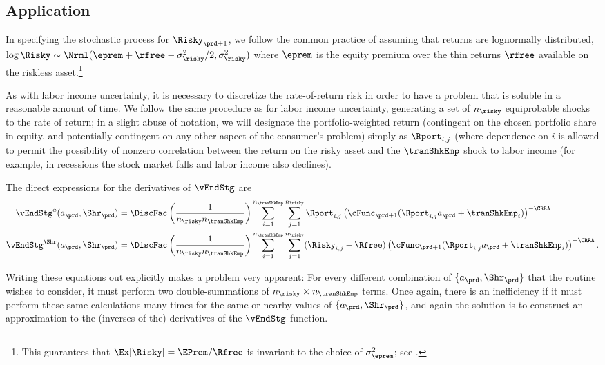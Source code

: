 \documentclass[SolvingMicroDSOPs]{subfiles}
\begin{document}
\subsection{Application}\label{subsec:MCApplication}


In specifying the stochastic process for $\Risky_{\prd+1}$, we follow the common practice of assuming that returns are lognormally distributed, $\log \Risky \sim \Nrml(\eprem+\rfree-\sigma^{2}_{\risky}/2,\sigma^{2}_{\risky})$ where $\eprem$ is the equity premium over the thin returns $\rfree$ available on the riskless asset.\footnote{This guarantees that $\Ex[\Risky] = \EPrem/\Rfree$ is invariant to the choice of $\sigma^{2}_{\eprem}$; see .}

As with labor income uncertainty, it is necessary to discretize the rate-of-return risk in order to have a problem that is soluble in a reasonable amount of time.  We follow the same procedure as for labor income uncertainty, generating a set of $n_{\risky}$ equiprobable shocks to the rate of return; in a slight abuse of notation, we will designate the portfolio-weighted return (contingent on the chosen portfolio share in equity, and potentially contingent on any other aspect of the consumer's problem) simply as $\Rport_{i,j}$ (where dependence on $i$ is allowed to permit the possibility of nonzero correlation between the return on the risky asset and the $\tranShkEmp$ shock to labor income (for example, in recessions the stock market falls and labor income also declines).

The direct expressions for the derivatives of $\vEndStg$ are
\begin{equation}\begin{gathered}\begin{aligned}
      \vEndStg^{a}(a_{\prd},\Shr_{\prd})  & = \DiscFac \left(\frac{1}{n_{\risky} n_{\tranShkEmp}}\right)\sum_{i=1}^{n_{\tranShkEmp}}\sum_{j=1}^{n_{\risky} }\Rport_{i,j} \left(\cFunc_{\prd+1}(\Rport_{i,j}a_{\prd}+\tranShkEmp_{i})\right)^{-\CRRA}
      \\      \vEndStg^{\Shr}(a_{\prd},\Shr_{\prd})  & = \DiscFac \left(\frac{1}{n_{\risky} n_{\tranShkEmp}}\right)\sum_{i=1}^{n_{\tranShkEmp}}\sum_{j=1}^{n_{\risky} }(\Risky_{i,j}-\Rfree)\left(\cFunc_{\prd+1}(\Rport_{i,j}a_{\prd}+\tranShkEmp_{i})\right)^{-\CRRA}.
    \end{aligned}\end{gathered}\end{equation}

Writing these equations out explicitly makes a problem very apparent: For every different combination of $\{{a}_{\prd},\Shr_{\prd}\}$ that the routine wishes to consider, it must perform two double-summations of $n_{\risky} \times n_{\tranShkEmp}$ terms.  Once again, there is an inefficiency if it must perform these same calculations many times for the same or nearby values of $\{{a}_{\prd},\Shr_{\prd}\}$, and again the solution is to construct an approximation to the (inverses of the) derivatives of the $\vEndStg$ function.
\end{document}
